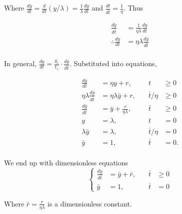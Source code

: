 \documentclass[12pt]{article}
\begin{document}
Where $\frac{d\bar{y}}{dt} = \frac{d}{dt}(y/\lambda) = \frac{1}{\lambda}\frac{dy}{dt}$ and
$\frac{dt}{d\bar{t}} = \frac{1}{\eta}$. Thus

\begin{equation}
  \begin{aligned}
    \frac{d\bar{y}}{d\bar{t}} &= \frac{1}{\eta\lambda}\frac{dy}{dt} \\
    \therefore \frac{dy}{dt} &= \eta\lambda\frac{d\bar{y}}{d\bar{t}} \\
  \end{aligned}
\end{equation}

In general, $\frac{dy}{dt} = \frac{y_c}{t_c} \cdot \frac{d\bar{y}}{d\bar{t}}$.
Substituted into equations,

\begin{equation}
  \begin{aligned}
    \frac{dy}{dt} &= \eta y+r, &\quad t&\ge0 \\
    \eta\lambda\frac{d\bar{y}}{d\bar{t}} &= \eta\lambda\bar{y}+r, &\quad \bar{t}/\eta&\ge0 \\
    \frac{d\bar{y}}{d\bar{t}} &= \bar{y}+\frac{r}{\eta\lambda}, &\quad \bar{t}&\ge0 \\
    y &= \lambda, &\quad t&=0 \\
    \lambda\bar{y} &= \lambda, &\quad \bar{t}/\eta &= 0 \\
    \bar{y} &= 1, &\quad\bar{t}&=0. \\
  \end{aligned}
\end{equation}

We end up with dimensionless equations
\begin{equation} \left\{
  \begin{aligned}
    \frac{d\bar{y}}{d\bar{t}} &= \bar{y} + \bar{r}, &\quad \bar{t}&\ge0 \\
    \bar{y} &= 1, &\quad \bar{t} &= 0
  \end{aligned} \right.
\end{equation}

Where $\bar{r} = \frac{r}{\eta\lambda}$ is a dimensionless constant.
\end{document}
